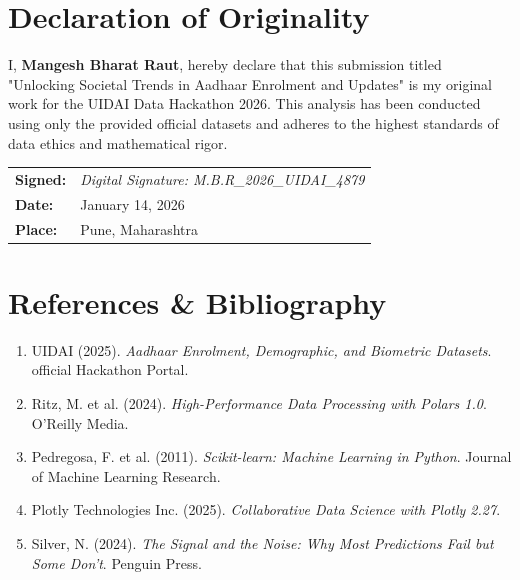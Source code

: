 \documentclass[12pt,a4paper]{article}
\begin{document}
\section{Declaration of Originality}

I, \textbf{Mangesh Bharat Raut}, hereby declare that this submission titled "Unlocking Societal Trends in Aadhaar Enrolment and Updates" is my original work for the UIDAI Data Hackathon 2026. This analysis has been conducted using only the provided official datasets and adheres to the highest standards of data ethics and mathematical rigor.

\vspace{1cm}
\begin{tabular}{ll}
\textbf{Signed:} & \textit{Digital Signature: M.B.R\_2026\_UIDAI\_4879} \\
\textbf{Date:} & January 14, 2026 \\
\textbf{Place:} & Pune, Maharashtra \\
\end{tabular}

\section{References \& Bibliography}

\begin{enumerate}[label=[\arabic*]]
    \item UIDAI (2025). \textit{Aadhaar Enrolment, Demographic, and Biometric Datasets}. official Hackathon Portal.
    \item Ritz, M. et al. (2024). \textit{High-Performance Data Processing with Polars 1.0}. O'Reilly Media.
    \item Pedregosa, F. et al. (2011). \textit{Scikit-learn: Machine Learning in Python}. Journal of Machine Learning Research.
    \item Plotly Technologies Inc. (2025). \textit{Collaborative Data Science with Plotly 2.27}.
    \item Silver, N. (2024). \textit{The Signal and the Noise: Why Most Predictions Fail but Some Don't}. Penguin Press.
\end{enumerate}

\vfill
\end{document}
